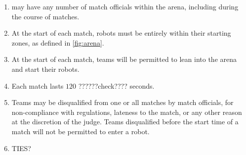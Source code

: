 \begin{enumerate}
  \item \org may have any number of match officials within the arena, including
        during the course of matches.
  \item At the start of each match, robots must be entirely within their
        starting zones, as defined in \ref{fig:arena}.
  \item At the start of each match, teams will be permitted to lean into the
        arena and start their robots.
  \item Each match lasts $120$ ??????check???? seconds.
  \item Teams may be disqualified from one or all matches by match officials,
        for non-compliance with regulations, lateness to the match, or any other
        reason at the discretion of the judge. Teams disqualified before the
        start time of a match will not be permitted to enter a robot.
  \item TIES?
\end{enumerate}

